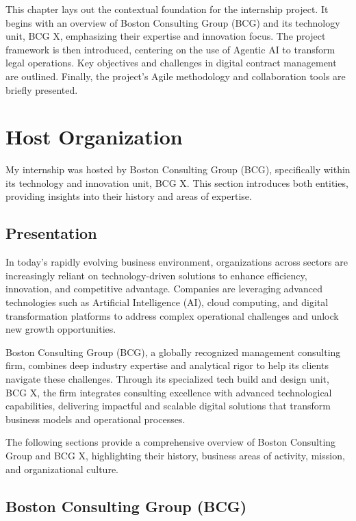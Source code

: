 This chapter lays out the contextual foundation for the internship project. It begins with an overview of Boston Consulting Group (BCG) and its technology unit, BCG X, emphasizing their expertise and innovation focus. The project framework is then introduced, centering on the use of Agentic AI to transform legal operations. Key objectives and challenges in digital contract management are outlined. Finally, the project’s Agile methodology and collaboration tools are briefly presented.

\newpage
{}

\section{Host Organization}

My internship was hosted by Boston Consulting Group (BCG), specifically within its technology and innovation unit, BCG X. This section introduces both entities, providing insights into their history and areas of expertise.

\subsection{Presentation}
In today's rapidly evolving business environment, organizations across sectors are increasingly reliant on technology-driven solutions to enhance efficiency, innovation, and competitive advantage. Companies are leveraging advanced technologies such as Artificial Intelligence (AI), cloud computing, and digital transformation platforms to address complex operational challenges and unlock new growth opportunities.\mynewline

Boston Consulting Group (BCG), a globally recognized management consulting firm, combines deep industry expertise and analytical rigor to help its clients navigate these challenges. Through its specialized tech build and design unit, BCG X, the firm integrates consulting excellence with advanced technological capabilities, delivering impactful and scalable digital solutions that transform business models and operational processes.\mynewline

The following sections provide a comprehensive overview of Boston Consulting Group and BCG X, highlighting their history, business areas of activity, mission, and organizational culture.

\subsection{Boston Consulting Group (BCG)}

